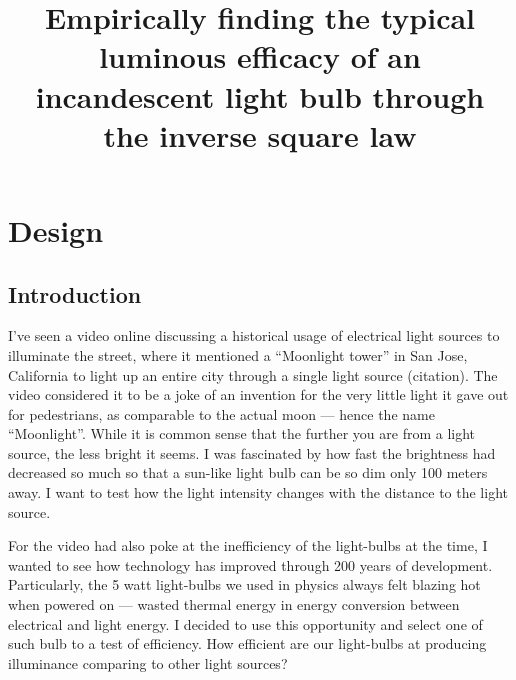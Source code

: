 \documentclass[a4paper,12pt]{article}
\title{Empirically finding the typical luminous efficacy of an incandescent light bulb through the inverse square law}
\author{}
\date{\vspace{-8ex}}
\begin{document}
\maketitle

\section{Design}

\subsection{Introduction}
I've seen a video online discussing a historical usage of electrical light sources to illuminate the street, where it mentioned a ``Moonlight tower'' in San Jose, California to light up an entire city through a single light source (citation). The video considered it to be a joke of an invention for the very little light it gave out for pedestrians, as comparable to the actual moon --- hence the name ``Moonlight''. While it is common sense that the further you are from a light source, the less bright it seems. I was fascinated by how fast the brightness had decreased so much so that a sun-like light bulb can be so dim only 100 meters away. I want to test how the light intensity changes with the distance to the light source.

For the video had also poke at the inefficiency of the light-bulbs at the time, I wanted to see how technology has improved through 200 years of development. Particularly, the 5 watt light-bulbs we used in physics always felt blazing hot when powered on --- wasted thermal energy in energy conversion between electrical and light energy. I decided to use this opportunity and select one of such bulb to a test of efficiency. How efficient are our light-bulbs at producing illuminance comparing to other light sources?

\end{document}
